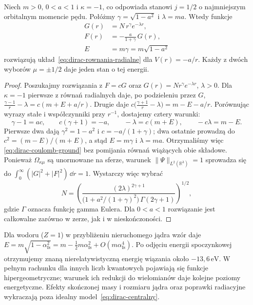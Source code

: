 \begin{przyklad}
\label{prz:dirac-coulomb-ground}
Niech $m>0$, $0<a<1$ i $\kappa=-1$, co odpowiada
stanowi $j=1/2$ o najmniejszym orbitalnym
momencie pędu. Połóżmy
$\gamma=\sqrt{1-a^2}$ i $\lambda=ma$.
Wtedy funkcje
\begin{equation}\label{eq:dirac-coulomb-ground}
 \begin{aligned}
 G(r)&=N\,r^{\gamma}e^{-\lambda r},\\
 F(r)&=-\frac{a}{1+\gamma}\,G(r),\\
 E&=m\gamma=m\sqrt{1-a^2}
 \end{aligned}
\end{equation}
rozwiązują układ~\eqref{eq:dirac-rownania-radialne}
dla $V(r)=-a/r$. Każdy z dwóch wyborów
$\mu=\pm1/2$ daje jeden stan o tej energii.
\end{przyklad}
\begin{proof}
Poszukajmy rozwiązania z $F=cG$ oraz
$G(r)=Nr^\gamma e^{-\lambda r}$, $\lambda>0$.
Dla $\kappa=-1$ pierwsze z równań radialnych
daje, po podzieleniu przez $G$,
$\frac{\gamma-1}{r}-\lambda
=c(m+E+a/r)$.
Drugie daje
$c\bigl(\frac{\gamma+1}{r}-\lambda\bigr)
=m-E-a/r$.
Porównując wyrazy stałe i współczynniki przy
$r^{-1}$, dostajemy cztery warunki:
\[
 \gamma-1=ac,\qquad c(\gamma+1)=-a,
 \qquad -\lambda=c(m+E),\qquad -c\lambda=m-E.
\]
Pierwsze dwa dają $\gamma^2=1-a^2$ i
$c=-a/(1+\gamma)$; dwa ostatnie prowadzą do
$c^2=(m-E)/(m+E)$, a stąd $E=m\gamma$
i $\lambda=ma$. Otrzymaliśmy więc
\eqref{eq:dirac-coulomb-ground} bez pomijania
równań wiążących obie składowe.
Ponieważ $\Omega_{\kappa\mu}$ są unormowane
na sferze, warunek $\|\Psi\|_{L^2(\mathbb R^3)}=1$
sprowadza się do
$\int_0^\infty(|G|^2+|F|^2)\,\dd r=1$.
Wystarczy więc wybrać
\[
 N=\left(\frac{(2\lambda)^{2\gamma+1}}
 {\bigl(1+a^2/(1+\gamma)^2\bigr)\,
  \Gamma(2\gamma+1)}\right)^{1/2},
\]
gdzie $\Gamma$ oznacza funkcję gamma Eulera.
Dla $0<a<1$ rozwiązanie jest całkowalne
zarówno w zerze, jak i w nieskończoności.
\end{proof}

Dla wodoru ($Z=1$) w przybliżeniu nieruchomego
jądra wzór daje
$E=m\sqrt{1-\alpha_{\mathrm{fs}}^2}
 =m-\tfrac12m\alpha_{\mathrm{fs}}^2
 +O(m\alpha_{\mathrm{fs}}^4)$.
Po odjęciu energii spoczynkowej otrzymujemy
znaną nierelatywistyczną energię wiązania
około $-13{,}6\,\mathrm{eV}$.
W pełnym rachunku dla innych liczb kwantowych
pojawiają się funkcje hipergeometryczne;
warunek ich redukcji do wielomianów daje
kolejne poziomy energetyczne. Efekty skończonej
masy i rozmiaru jądra oraz poprawki radiacyjne
wykraczają poza idealny model~\eqref{eq:dirac-centralny}.


